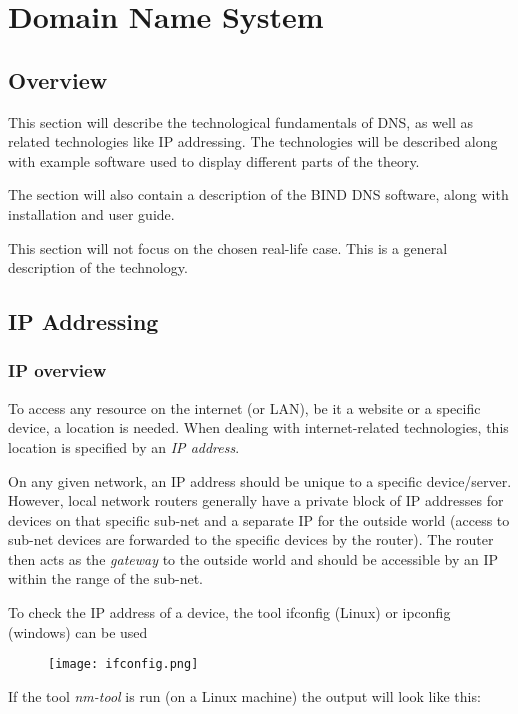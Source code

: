 \chapter{Domain Name System}
\section{Overview}
This section will describe the technological fundamentals of DNS, as well as related technologies like IP addressing. The technologies will be described along with example software used to display different parts of the theory.

The section will also contain a description of the BIND DNS software, along with installation and user guide. 

This section will not focus on the chosen real-life case. This is a general description of the technology.
\section{IP Addressing}
\subsection{IP overview}
To access any resource on the internet (or LAN), be it a website or a specific device, a location is needed. When dealing with internet-related technologies, this location is specified by an \textit{IP address}. 

On any given network, an IP address should be unique to a specific device/server. However, local network routers generally have a private block of IP addresses for devices on that specific sub-net and a separate IP for the outside world (access to sub-net devices are forwarded to the specific devices by the router).
The router then acts as the \textit{gateway} to the outside world and should be accessible by an IP within the range of the sub-net.

To check the IP address of a device, the tool ifconfig (Linux) or ipconfig (windows) can be used


\begin{figure}[h!]
	\texttt{[image: ifconfig.png]}
\end{figure}


If the tool \textit{nm-tool} is run (on a Linux machine) the output will look like this:


